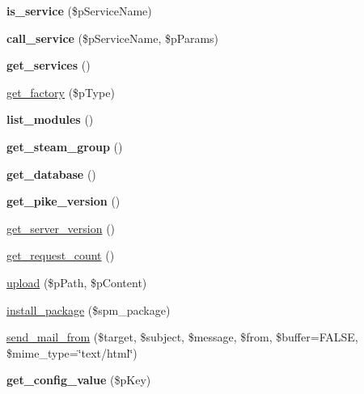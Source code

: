 \begin{DoxyCompactItemize}
\item 
\hypertarget{classsteam__connector_acd110d4b3dc0a97712047958d86eb004}{
{\bfseries is\_\-service} (\$pServiceName)}
\label{classsteam__connector_acd110d4b3dc0a97712047958d86eb004}

\item 
\hypertarget{classsteam__connector_a23f3eea5f5ab20103716707c2ca10862}{
{\bfseries call\_\-service} (\$pServiceName, \$pParams)}
\label{classsteam__connector_a23f3eea5f5ab20103716707c2ca10862}

\item 
\hypertarget{classsteam__connector_a268f2270c49d4910732a6df2186cd4fc}{
{\bfseries get\_\-services} ()}
\label{classsteam__connector_a268f2270c49d4910732a6df2186cd4fc}

\item 
\hyperlink{classsteam__connector_a51d0d79b84fb9e707a7e9df534159342}{get\_\-factory} (\$pType)
\item 
\hypertarget{classsteam__connector_ac706e60e5944ccf35ed57968897d8ce5}{
{\bfseries list\_\-modules} ()}
\label{classsteam__connector_ac706e60e5944ccf35ed57968897d8ce5}

\item 
\hypertarget{classsteam__connector_a1a5c5590fd2ab23076500a5f0b2897ed}{
{\bfseries get\_\-steam\_\-group} ()}
\label{classsteam__connector_a1a5c5590fd2ab23076500a5f0b2897ed}

\item 
\hypertarget{classsteam__connector_ac68771745267d1d216ef3cabd7aad40f}{
{\bfseries get\_\-database} ()}
\label{classsteam__connector_ac68771745267d1d216ef3cabd7aad40f}

\item 
\hypertarget{classsteam__connector_ae3c9a29fddf3a6f7de3c46b11a3f43e4}{
{\bfseries get\_\-pike\_\-version} ()}
\label{classsteam__connector_ae3c9a29fddf3a6f7de3c46b11a3f43e4}

\item 
\hyperlink{classsteam__connector_ab4f88f29030bb5a429771cce013dbfef}{get\_\-server\_\-version} ()
\item 
\hyperlink{classsteam__connector_a8c1dd62ea11e831a5ca53950b5600572}{get\_\-request\_\-count} ()
\item 
\hyperlink{classsteam__connector_a1e95396f77b7e61e53d5b4b0234a6202}{upload} (\$pPath, \$pContent)
\item 
\hyperlink{classsteam__connector_a8ca3a81759c36c1c5c8280fc4d092a46}{install\_\-package} (\$spm\_\-package)
\item 
\hyperlink{classsteam__connector_abd2ef34d4fd4886add56e1d6e8c89a63}{send\_\-mail\_\-from} (\$target, \$subject, \$message, \$from, \$buffer=FALSE, \$mime\_\-type=\char`\"{}text/html\char`\"{})
\item 
\hypertarget{classsteam__connector_af1027d8fd3ac09717242a37a93099743}{
{\bfseries get\_\-config\_\-value} (\$pKey)}
\label{classsteam__connector_af1027d8fd3ac09717242a37a93099743}


\end{DoxyCompactItemize}
